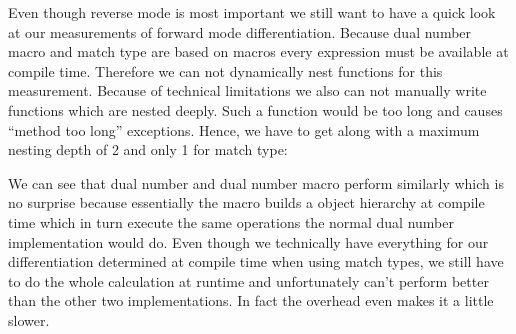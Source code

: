 Even though reverse mode is most important we still want to have a quick look at our measurements of forward mode differentiation. Because dual number macro and match type are based on macros every expression must be available at compile time. Therefore we can not dynamically nest functions for this measurement. Because of technical limitations we also can not manually write functions which are nested deeply. Such a function would be too long and causes ``method too long'' exceptions. Hence, we have to get along with a maximum nesting depth of 2 and only 1 for match type:
\begin{center}
\end{center}
We can see that dual number and dual number macro perform similarly which is no surprise because essentially the macro builds a object hierarchy at compile time which in turn execute the same operations the normal dual number implementation would do. Even though we technically have everything for our differentiation determined at compile time when using match types, we still have to do the whole calculation at runtime and unfortunately can't perform better than the other two implementations. In fact the overhead even makes it a little slower.


%
%
%
%


